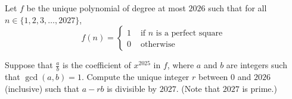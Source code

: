 Let $f$ be the unique polynomial of degree at most $2026$ such that for all $n \in\{1,2,3, \ldots, 2027\}$,
$$
f(n)= \begin{cases}1 & \text { if } n \text { is a perfect square } \\ 0 & \text { otherwise }\end{cases}
$$

Suppose that $\frac{a}{b}$ is the coefficient of $x^{2025}$ in $f$, where $a$ and $b$ are integers such that $\operatorname{gcd}(a, b)=1$. Compute the unique integer $r$ between $0$ and $2026$ (inclusive) such that $a-r b$ is divisible by $2027$. (Note that $2027$ is prime.)